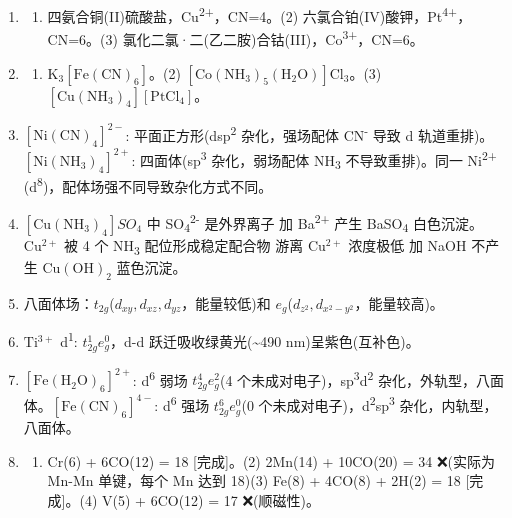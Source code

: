 \begin{enumerate}
\def\labelenumi{\arabic{enumi}.}
\item
  \begin{enumerate}
  \def\labelenumii{(\arabic{enumii})}
  \tightlist
  \item
    四氨合铜(II)硫酸盐，Cu\textsuperscript{2+}，CN=4。(2) 六氯合铂(IV)酸钾，Pt\textsuperscript{4+}，CN=6。(3) 氯化二氯·二(乙二胺)合钴(III)，Co\textsuperscript{3+}，CN=6。
  \end{enumerate}
\item
  \begin{enumerate}
  \def\labelenumii{(\arabic{enumii})}
  \tightlist
  \item
    \(\mathrm{K_3[Fe(CN)_6]}\)。(2) \(\mathrm{[Co(NH_3)_5(H_2O)]Cl_3}\)。(3) \(\mathrm{[Cu(NH_3)_4][PtCl_4]}\)。
  \end{enumerate}
\item
  \(\mathrm{[Ni(CN)_4]^{2-}}\): 平面正方形(dsp\textsuperscript{2} 杂化，强场配体 CN\textsuperscript{-} 导致 d 轨道重排)。\(\mathrm{[Ni(NH_3)_4]^{2+}}\): 四面体(sp\textsuperscript{3} 杂化，弱场配体 NH\textsubscript{3} 不导致重排)。同一 Ni\textsuperscript{2+}(d\textsuperscript{8})，配体场强不同导致杂化方式不同。
\item
  \([\mathrm{Cu(NH_3)_4}]SO_4\) 中 SO\textsubscript{4}\textsuperscript{2-} 是外界离子 \箭 加 Ba\textsuperscript{2+} 产生 BaSO\textsubscript{4} 白色沉淀。\(\mathrm{Cu^{2+}}\) 被 4 个 NH\textsubscript{3} 配位形成稳定配合物 \箭 游离 \(\mathrm{Cu^{2+}}\) 浓度极低 \箭 加 NaOH 不产生 \(\mathrm{Cu(OH)_2}\) 蓝色沉淀。
\item
  八面体场：\(t_{2g}\)(\(d_{xy}, d_{xz}, d_{yz}\)，能量较低)和 \(e_g\)(\(d_{z^2}, d_{x^2-y^2}\)，能量较高)。
\item
  \(\mathrm{Ti^{3+}}\) d\textsuperscript{1}: \(t_{2g}^1 e_g^0\)，d-d 跃迁吸收绿黄光(\textasciitilde490 nm)\箭 呈紫色(互补色)。
\item
  \(\mathrm{[Fe(H_2O)_6]^{2+}}\): d\textsuperscript{6} 弱场 \箭 \(t_{2g}^4 e_g^2\)(4 个未成对电子)，sp\textsuperscript{3}d\textsuperscript{2} 杂化，外轨型，八面体。\(\mathrm{[Fe(CN)_6]^{4-}}\): d\textsuperscript{6} 强场 \箭 \(t_{2g}^6 e_g^0\)(0 个未成对电子)，d\textsuperscript{2}sp\textsuperscript{3} 杂化，内轨型，八面体。
\item
  \begin{enumerate}
  \def\labelenumii{(\arabic{enumii})}
  \tightlist
  \item
    Cr(6) + 6CO(12) = 18 {[}完成{]}。(2) 2Mn(14) + 10CO(20) = 34  ❌(实际为 Mn-Mn 单键，每个 Mn 达到 18)(3) Fe(8) + 4CO(8) + 2H(2) = 18 {[}完成{]}。(4) V(5) + 6CO(12) = 17  ❌(顺磁性)。

\end{enumerate}
\end{enumerate}

